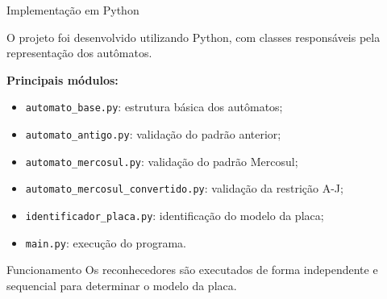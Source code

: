 \documentclass[aspectratio=169,12pt]{beamer}
\begin{document}
\begin{frame}{Implementação em Python}

    O projeto foi desenvolvido utilizando Python,
    com classes responsáveis pela representação dos autômatos.

    \vspace{0.3cm}

    \textbf{Principais módulos:}

    \begin{itemize}
        \item \texttt{automato\_base.py}: estrutura básica dos autômatos;
        \item \texttt{automato\_antigo.py}: validação do padrão anterior;
        \item \texttt{automato\_mercosul.py}: validação do padrão Mercosul;
        \item \texttt{automato\_mercosul\_convertido.py}:
        validação da restrição A-J;
        \item \texttt{identificador\_placa.py}:
        identificação do modelo da placa;
        \item \texttt{main.py}: execução do programa.
    \end{itemize}

    \vspace{0.3cm}

    \begin{block}{Funcionamento}
        Os reconhecedores são executados de forma independente
        e sequencial para determinar o modelo da placa.
    \end{block}

\end{frame}

\end{document}
